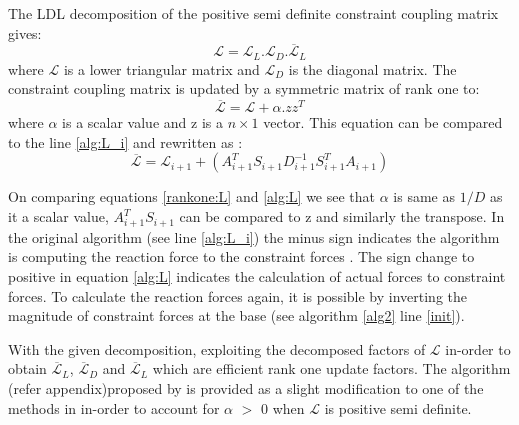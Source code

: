 The LDL decomposition of the positive semi definite constraint coupling matrix gives:
\begin{equation}
\mathcal{L}= \mathcal{L}_{L} . \mathcal{L}_{D} . \overline{\mathcal{L}}_{L}
\end{equation}
where $\mathcal{L}$ is a lower triangular matrix and $\mathcal{L}_{D}$ is the diagonal matrix. %
The constraint coupling matrix is updated by a symmetric matrix of rank one to:
\begin{equation}
\overline{\mathcal{L}} = \mathcal{L} + \alpha.zz^{T}
\label{rankone:L}
\end{equation}
where $\alpha$ is a scalar value and z is a $n\times1$ vector. This equation can be compared to the line \ref{alg:L_i} and rewritten as :
\begin{equation}
\overline{\mathcal{L}} = \mathcal{L}_{i+1} + (A_{i+1}^T S_{i+1}D^{-1}_{i+1} S_{i+1}^T A_{i+1})
\label{alg:L}
\end{equation}


On comparing equations \ref{rankone:L} and \ref{alg:L} we see that $\alpha$ is same as $1/D$ as it a scalar value, $A_{i+1}^T S_{i+1}$ can be compared to z and similarly the transpose. In the original algorithm (see line \ref{alg:L_i}) the minus sign indicates the algorithm is computing the reaction force to the constraint forces \cite{bryunixonline}. The sign change to positive in equation \ref{alg:L} indicates the calculation of actual forces to constraint forces. To calculate the reaction forces again, it is possible by inverting the magnitude of constraint forces at the base (see algorithm \ref{alg2} line \ref{init}).

 
With the given decomposition, exploiting the decomposed factors of $\mathcal{L}$ in-order to obtain $\overline{\mathcal{L}}_{L}$, $\overline{\mathcal{L}}_{D}$ and $\overline{\mathcal{L}}_{L}$ which are efficient rank one update factors. The algorithm (refer appendix)proposed by \cite{sentana1999econometric} is provided as a slight modification to one of the methods in \cite{gill2007methods} in-order to account for $\alpha$ $>$ 0 when $\mathcal{L}$ is positive semi definite. 



